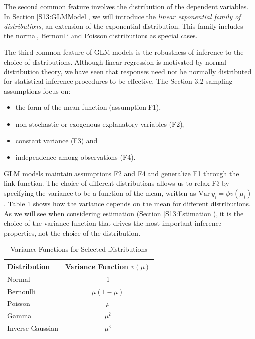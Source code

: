 The second common feature involves the distribution of the dependent
variables. In Section \ref{S13:GLMModel}, we will introduce the
\emph{linear exponential family of distributions}, an extension of
the exponential distribution. This family includes the normal,
Bernoulli and Poisson distributions as special cases.

The third common feature of GLM models is the robustness of
inference to the choice of distributions. Although linear regression
is motivated by normal distribution theory, we have seen that
responses need not be normally distributed for statistical inference
procedures to be effective. The Section 3.2 sampling assumptions
focus on:
\begin{itemize}
  \item the form of the mean function (assumption F1),
  \item non-stochastic or exogenous explanatory variables (F2),
  \item constant variance (F3) and
  \item independence among observations (F4).
\end{itemize}
GLM models maintain assumptions F2 and F4 and generalize F1 through
the link function. The choice of different distributions allows us
to relax F3 by specifying the variance to be a function of the mean,
written as $\mathrm{Var~}y_i = \phi v(\mu_i)$. Table
\ref{T13:VarianceFunctions} shows how the variance depends on the
mean for different distributions. As we will see when considering
estimation (Section \ref{S13:Estimation}), it is the choice of the
variance function that drives the most important inference
properties, not the choice of the distribution.



\begin{table}[h]
\caption{\label{T13:VarianceFunctions} Variance Functions for
Selected Distributions} 
\begin{tabular}{lc}
\hline
Distribution & Variance Function $v(\mu)$ \\
\hline
Normal & 1 \\
Bernoulli & $\mu ( 1- \mu ) $ \\
Poisson & $\mu $ \\
Gamma & $\mu ^2 $ \\
Inverse Gaussian & $\mu ^3 $ \\
\hline
\end{tabular}
\end{table}



